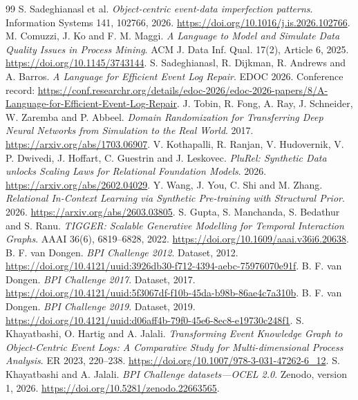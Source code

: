 \documentclass[11pt]{article}
\begin{document}
\begin{thebibliography}{99}
 S. Sadeghianasl et al. \emph{Object-centric event-data imperfection patterns}. Information Systems 141, 102766, 2026. \url{https://doi.org/10.1016/j.is.2026.102766}.
 M. Comuzzi, J. Ko and F. M. Maggi. \emph{A Language to Model and Simulate Data Quality Issues in Process Mining}. ACM J. Data Inf. Qual. 17(2), Article 6, 2025. \url{https://doi.org/10.1145/3743144}.
 S. Sadeghianasl, R. Dijkman, R. Andrews and A. Barros. \emph{A Language for Efficient Event Log Repair}. EDOC 2026. Conference record: \url{https://conf.researchr.org/details/edoc-2026/edoc-2026-papers/8/A-Language-for-Efficient-Event-Log-Repair}.
 J. Tobin, R. Fong, A. Ray, J. Schneider, W. Zaremba and P. Abbeel. \emph{Domain Randomization for Transferring Deep Neural Networks from Simulation to the Real World}. 2017. \url{https://arxiv.org/abs/1703.06907}.
 V. Kothapalli, R. Ranjan, V. Hudovernik, V. P. Dwivedi, J. Hoffart, C. Guestrin and J. Leskovec. \emph{PluRel: Synthetic Data unlocks Scaling Laws for Relational Foundation Models}. 2026. \url{https://arxiv.org/abs/2602.04029}.
 Y. Wang, J. You, C. Shi and M. Zhang. \emph{Relational In-Context Learning via Synthetic Pre-training with Structural Prior}. 2026. \url{https://arxiv.org/abs/2603.03805}.
 S. Gupta, S. Manchanda, S. Bedathur and S. Ranu. \emph{TIGGER: Scalable Generative Modelling for Temporal Interaction Graphs}. AAAI 36(6), 6819--6828, 2022. \url{https://doi.org/10.1609/aaai.v36i6.20638}.
 B. F. van Dongen. \emph{BPI Challenge 2012}. Dataset, 2012. \url{https://doi.org/10.4121/uuid:3926db30-f712-4394-aebc-75976070e91f}.
 B. F. van Dongen. \emph{BPI Challenge 2017}. Dataset, 2017. \url{https://doi.org/10.4121/uuid:5f3067df-f10b-45da-b98b-86ae4c7a310b}.
 B. F. van Dongen. \emph{BPI Challenge 2019}. Dataset, 2019. \url{https://doi.org/10.4121/uuid:d06aff4b-79f0-45e6-8ec8-e19730c248f1}.
 S. Khayatbashi, O. Hartig and A. Jalali. \emph{Transforming Event Knowledge Graph to Object-Centric Event Logs: A Comparative Study for Multi-dimensional Process Analysis}. ER 2023, 220--238. \url{https://doi.org/10.1007/978-3-031-47262-6_12}.
 S. Khayatbashi and A. Jalali. \emph{BPI Challenge datasets---OCEL 2.0}. Zenodo, version 1, 2026. \url{https://doi.org/10.5281/zenodo.22663565}.
\end{thebibliography}
\end{document}
